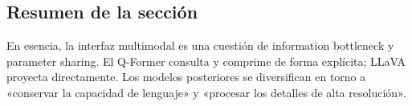 \subsection{Resumen de la sección}

En esencia, la interfaz multimodal es una cuestión de information bottleneck y parameter sharing. El Q-Former consulta y comprime de forma explícita; LLaVA proyecta directamente. Los modelos posteriores se diversifican en torno a «conservar la capacidad de lenguaje» y «procesar los detalles de alta resolución».
